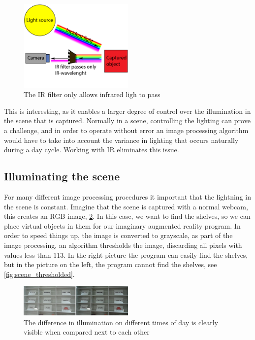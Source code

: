\begin{figure}[htbp] 
\centering 
\includegraphics[width=0.5\textwidth]{Pictures/Theory/IR_filter.png} 
\caption{The IR filter only allows infrared ligh to pass} 
\label{fig:ir_filter} 
\end{figure}

This is interesting, as it enables a larger degree of control over the illumination in the scene that is captured. Normally in a scene, controlling the lighting   can prove a challenge, and in order to operate without error an image processing algorithm would have to take into account the variance in lighting that occurs naturally during a day cycle. Working with IR eliminates this issue.

\subsection{Illuminating the scene}

For many different image processing procedures it important that the lightning in the scene is constant. Imagine that the scene is captured with a normal webcam, this creates an RGB image, \ref{fig:scene_light}.  In this case, we want to find the shelves, so we can place virtual objects in them for our imaginary augmented reality program. In order to speed things up, the image is converted to grayscale, as part of the  image processing, an algorithm thresholds the image, discarding all pixels with values less than 113. In the right picture the program can easily find the shelves, but in the picture on the left, the program cannot find the shelves, see \ref{fig:scene_thresholded}.

\begin{figure}[htbp] 
\centering 
\includegraphics[width=0.5\textwidth]{Pictures/HjoerringLibrary/scene_lighting.png} 
\caption{The difference in illumination on different times of day is clearly visible when compared next to each other} 
\label{fig:scene_light} 
\end{figure}

